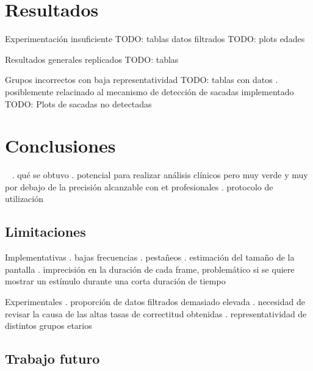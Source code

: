 \documentclass[aspectratio=169]{beamer}
\begin{document}
\section{Resultados}

\begin{frame}{Experimentación insuficiente}
TODO: tablas datos filtrados
TODO: plots edades
\end{frame}

\begin{frame}{Resultados generales replicados}
TODO: tablas
\end{frame}

\begin{frame}{Grupos incorrectos con baja representatividad}
TODO: tablas con datos
. posiblemente relacinado al mecanismo de detección de sacadas implementado
TODO: Plots de sacadas no detectadas
\end{frame}

\section{Conclusiones}

\begin{frame}{~}
. qué se obtuvo
. potencial para realizar análisis clínicos pero muy verde y muy por debajo de
  la precisión alcanzable con et profesionales
. protocolo de utilización
\end{frame}

\subsection{Limitaciones}

\begin{frame}{Implementativas}
. bajas frecuencias
. pestañeos
. estimación del tamaño de la pantalla
. imprecisión en la duración de cada frame, problemático si se quiere mostrar
  un estímulo durante una corta duración de tiempo
\end{frame}

\begin{frame}{Experimentales}
. proporción de datos filtrados demasiado elevada
. necesidad de revisar la causa de las altas tasas de correctitud obtenidas
. representatividad de distintos grupos etarios
\end{frame}

\subsection{Trabajo futuro}
\end{document}
